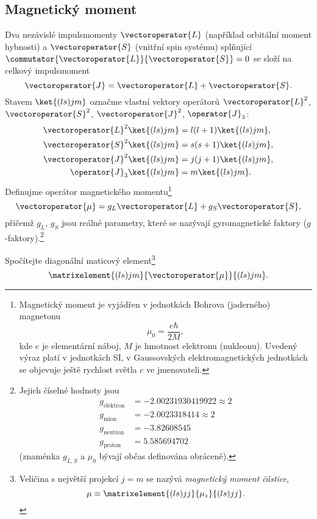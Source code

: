 \subsection{Magnetický moment}
	Dva nezávislé impulsmomenty $\vectoroperator{L}$ (například orbitální moment hybnosti) a $\vectoroperator{S}$ (vnitřní spin systému) splňující $\commutator{\vectoroperator{L}}{\vectoroperator{S}}=0$ se složí na celkový impulsmoment
	\begin{equation}
		\vectoroperator{J}=\vectoroperator{L}+\vectoroperator{S}.
	\end{equation}
	Stavem $\ket{(ls)jm}$ označme vlastní vektory operátorů $\vectoroperator{L}^{2}$, $\vectoroperator{S}^{2}$, $\vectoroperator{J}^{2}$, $\operator{J}_{3}$:
    \begin{subequations}
        \begin{align}
            \vectoroperator{L}^{2}\ket{(ls)jm}&=l(l+1)\ket{(ls)jm},\\
            \vectoroperator{S}^{2}\ket{(ls)jm}&=s(s+1)\ket{(ls)jm},\\
            \vectoroperator{J}^{2}\ket{(ls)jm}&=j(j+1)\ket{(ls)jm},\\
            \operator{J}_{3}\ket{(ls)jm}&=m\ket{(ls)jm}.
        \end{align}            
        \label{eq:LSEigenvalues}
    \end{subequations}
	Definujme operátor magnetického momentu\footnote{
		Magnetický moment je vyjádřen v jednotkách Bohrova (jaderného) magnetonu
		\begin{equation}
			\mu_{0}=\frac{e\hbar}{2M},
		\end{equation}
		kde $e$ je elementární náboj, $M$ je hmotnost elektronu (nukleonu).
		Uvedený výraz platí v jednotkách SI, v Gaussovských elektromagnetických jednotkách se objevuje ještě rychlost světla $c$ ve jmenovateli.
	}
	\begin{equation}
		\vectoroperator{\mu}=g_{L}\vectoroperator{L}+g_{S}\vectoroperator{S},
	\end{equation}
	přičemž $g_{L}$, $g_{S}$ jsou reálné parametry, které se nazývají gyromagnetické faktory ($g$-faktory).\footnote{
		Jejich číselné hodnoty jsou
		\begin{align}
			g_{\mathrm{elektron}}&=-2.00231930419922\approx2 \\
			g_{\mathrm{mion}}&=-2.0023318414\approx2 \\
			g_{\mathrm{neutron}}&=-3.82608545\\
			g_{\mathrm{proton}}&=5.585694702
		\end{align}
		(znaménka $g_{L,S}$ a $\mu_{0}$ bývají občas definována obráceně).
	}

	Spočítejte diagonální maticový element\footnote{
		Veličina s největší projekcí $j=m$ se nazývá \emph{magnetický moment částice},
		\begin{equation}
			\mu\equiv\matrixelement{(ls)jj}{\mu_{z}}{(ls)jj}.
		\end{equation}
	}
	\begin{equation}
		\matrixelement{(ls)jm}{\vectoroperator{\mu}}{(ls)jm}.
	\end{equation}
